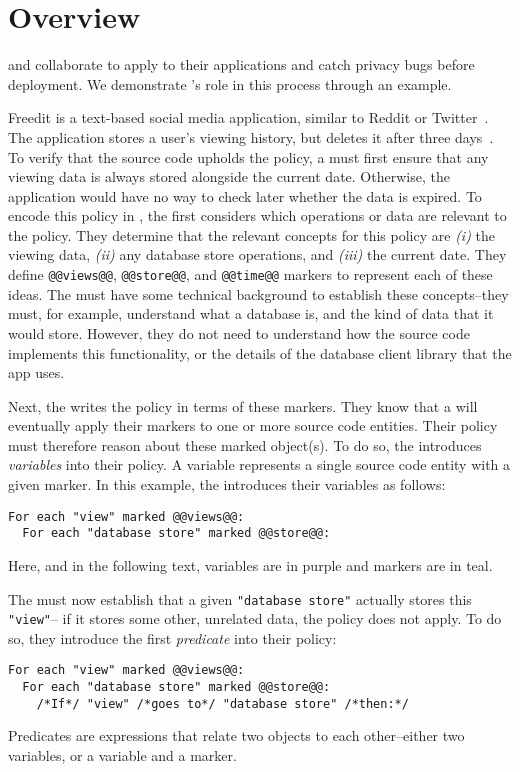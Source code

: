 \chapter{Overview}
\label{sec:overview}

\Ces{} and \devs{} collaborate to apply \sys{} to their applications and catch privacy bugs before deployment.
%
We demonstrate \syslang's role in this process through an example.

Freedit is a text-based social media application, similar to Reddit or Twitter~\cite{freedit}.
%
The application stores a user's viewing history, but deletes it after three days~\cite{freedit-pageviews}.
%
To verify that the source code upholds the policy, 
a \ce{} must first ensure that any viewing data is always stored alongside the current date.
%
Otherwise, the application would have no way to check later whether the data is expired.
%
To encode this policy in \syslang{}, the \ce{} first considers which operations or data are relevant to the policy.
%
They determine that the relevant concepts for this policy are \emph{(i)} the viewing data,
\emph{(ii)} any database store operations, and \emph{(iii)} the current date.
%
They define \lstinline[language=CNL]|@@views@@|, 
\lstinline[language=CNL]|@@store@@|, 
and \lstinline[language=CNL]|@@time@@| markers to represent each of these ideas.
%
The \ce{} must have some technical background to establish these concepts--they must, for example, understand what a database is,
and the kind of data that it would store.
%
However, they do not need to understand how the source code implements this functionality,
or the details of the database client library that the app uses.
%

Next, the \ce{} writes the policy in terms of these markers.
%
They know that a \dev{} will eventually apply their markers to one or more source code entities.
%
Their policy must therefore reason about these marked object(s).
%
To do so, the \ce{} introduces \emph{variables} into their policy.
%
A variable represents a single source code entity with a given marker.
%
In this example, the \ce{} introduces their variables as follows:
\begin{lstlisting}[language=CNL]
For each "view" marked @@views@@:
  For each "database store" marked @@store@@:
\end{lstlisting}
%
Here, and in the following text, variables are in purple and markers are in teal.

The \ce{} must now establish that a given \lstinline[language=CNL]|"database store"| actually stores this \lstinline[language=CNL]|"view"|--
if it stores some other, unrelated data, the policy does not apply.
%
To do so, they introduce the first \emph{predicate} into their policy:
\begin{lstlisting}[language=CNL]
For each "view" marked @@views@@:
  For each "database store" marked @@store@@:
    /*If*/ "view" /*goes to*/ "database store" /*then:*/
\end{lstlisting}
%
Predicates are expressions that relate two objects to each other--either two variables, or a variable and a marker.


